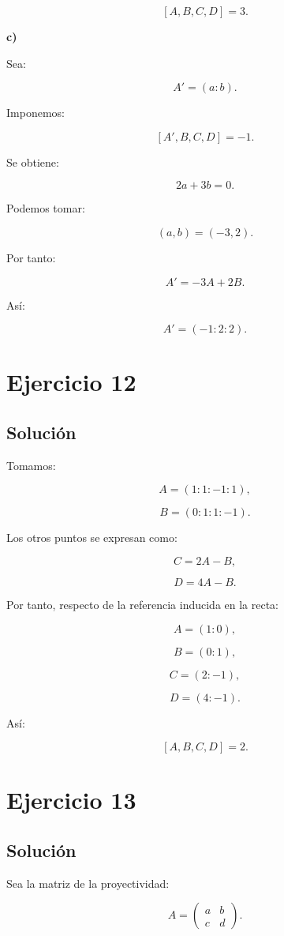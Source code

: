 \documentclass[11pt,a4paper]{article}
\begin{document}
\[
\boxed{
[A,B,C,D]=3.
}
\]

\textbf{c)}

Sea:

\[
A'=(a:b).
\]

Imponemos:

\[
[A',B,C,D]=-1.
\]

Se obtiene:

\[
2a+3b=0.
\]

Podemos tomar:

\[
(a,b)=(-3,2).
\]

Por tanto:

\[
A'=-3A+2B.
\]

Así:

\[
\boxed{
A'=(-1:2:2).
}
\]

\section{Ejercicio 12}
\subsection{Solución}

Tomamos:

\[
A=(1:1:-1:1),
\]

\[
B=(0:1:1:-1).
\]

Los otros puntos se expresan como:

\[
C=2A-B,
\]

\[
D=4A-B.
\]

Por tanto, respecto de la referencia inducida en la recta:

\[
A=(1:0),
\]

\[
B=(0:1),
\]

\[
C=(2:-1),
\]

\[
D=(4:-1).
\]

Así:

\[
\boxed{
[A,B,C,D]=2.
}
\]

\section{Ejercicio 13}
\subsection{Solución}

Sea la matriz de la proyectividad:

\[
A=
\begin{pmatrix}
a&b\\
c&d
\end{pmatrix}.
\]
\end{document}
